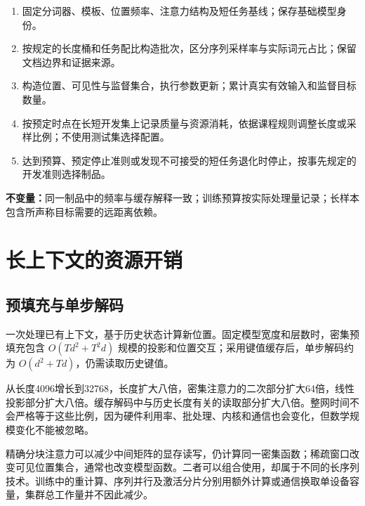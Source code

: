 \documentclass[../textbook.tex]{subfiles}
\begin{document}
\begin{algorithm}[长上下文适配训练]
\begin{enumerate}
\item 固定分词器、模板、位置频率、注意力结构及短任务基线；保存基础模型身份。
\item 按规定的长度桶和任务配比构造批次，区分序列采样率与实际词元占比；保留文档边界和证据来源。
\item 构造位置、可见性与监督集合，执行参数更新；累计真实有效输入和监督目标数量。
\item 按预定时点在长短开发集上记录质量与资源消耗，依据课程规则调整长度或采样比例；不使用测试集选择配置。
\item 达到预算、预定停止准则或发现不可接受的短任务退化时停止，按事先规定的开发准则选择制品。
\end{enumerate}
\textbf{不变量：}同一制品中的频率与缓存解释一致；训练预算按实际处理量记录；长样本包含所声称目标需要的远距离依赖。
\end{algorithm}

\section{长上下文的资源开销}

\subsection{预填充与单步解码}
一次处理已有上下文，基于历史状态计算新位置。固定模型宽度和层数时，密集预填充包含 $O(Td^2+T^2d)$ 规模的投影和位置交互；采用键值缓存后，单步解码约为 $O(d^2+Td)$，仍需读取历史键值。

从长度4096增长到32768，长度扩大八倍，密集注意力的二次部分扩大64倍，线性投影部分扩大八倍。缓存解码中与历史长度有关的读取部分扩大八倍。整网时间不会严格等于这些比例，因为硬件利用率、批处理、内核和通信也会变化，但数学规模变化不能被忽略。

精确分块注意力可以减少中间矩阵的显存读写，仍计算同一密集函数；稀疏窗口改变可见位置集合，通常也改变模型函数。二者可以组合使用，却属于不同的长序列技术。训练中的重计算、序列并行及激活分片分别用额外计算或通信换取单设备容量，集群总工作量并不因此减少。
\end{document}
